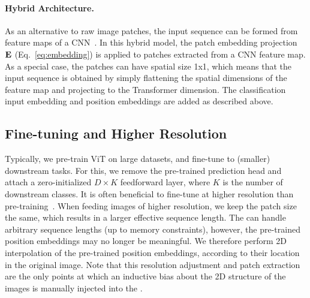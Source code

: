 \paragraph{Hybrid Architecture.}
As an alternative to raw image patches, the input sequence can be formed from feature maps of a CNN~\citep{LeCun1989BackpropagationAT}.
In this hybrid model, the patch embedding projection $\mathbf{E}$  (Eq.~\ref{eq:embedding}) is applied to patches extracted from a CNN feature map.
As a special case, the patches can have spatial size 1x1, which means that the input sequence is obtained by simply flattening the spatial dimensions of the feature map and projecting to the Transformer dimension.  
The classification input embedding and position embeddings are added as described above.

\subsection{Fine-tuning and Higher Resolution}

Typically, we pre-train ViT on large datasets, and fine-tune to (smaller) downstream  tasks.
For this, we remove the pre-trained prediction head and attach a zero-initialized $D\times K$ feedforward layer, where $K$ is the number of downstream classes.
It is often beneficial to fine-tune at higher resolution than pre-training~\citep{touvron2019,kolesnikov2020-bit}.
When feeding images of higher resolution, we keep the patch size the same, which results in a larger effective sequence length.
The \oursfull{} can handle arbitrary sequence lengths (up to memory constraints), however, the pre-trained position embeddings may no longer be meaningful.
We therefore perform 2D interpolation of the pre-trained position embeddings, according to their location in the original image.
Note that this resolution adjustment and patch extraction are the only points at which an inductive bias about the 2D structure of the images is manually injected into the \oursfull{}.

